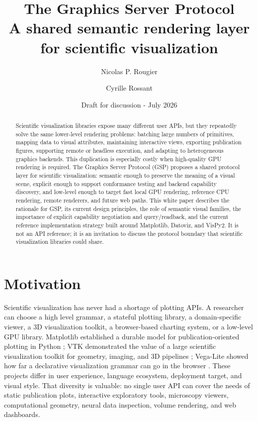 \documentclass[a4paper,11pt]{article}
\title{\textbf{The Graphics Server Protocol}\\
\large A shared semantic rendering layer for scientific visualization}
\author{Nicolas P. Rougier \and Cyrille Rossant}
\date{Draft for discussion - July 2026}
\newcommand{\gsp}{GSP\xspace}
\newcommand{\vispytwo}{VisPy2\xspace}
\newcommand{\datoviz}{Datoviz\xspace}
\newcommand{\matplotlib}{Matplotlib\xspace}
\begin{document}
\maketitle

\begin{abstract}
Scientific visualization libraries expose many different user APIs, but they repeatedly solve the
same lower-level rendering problems: batching large numbers of primitives, mapping data to visual
attributes, maintaining interactive views, exporting publication figures, supporting remote or
headless execution, and adapting to heterogeneous graphics backends. This duplication is especially
costly when high-quality GPU rendering is required. The Graphics Server Protocol (\gsp) proposes a
shared protocol layer for scientific visualization: semantic enough to preserve the meaning of a
visual scene, explicit enough to support conformance testing and backend capability discovery, and
low-level enough to target fast local GPU rendering, reference CPU rendering, remote renderers, and
future web paths. This white paper describes the rationale for \gsp, its current design principles,
the role of semantic visual families, the importance of explicit capability negotiation and
query/readback, and the current reference implementation strategy built around \matplotlib,
\datoviz, and \vispytwo. It is not an API reference; it is an invitation to discuss the protocol
boundary that scientific visualization libraries could share.
\end{abstract}

\tableofcontents

\section{Motivation}

Scientific visualization has never had a shortage of plotting APIs. A researcher can choose a high
level grammar, a stateful plotting library, a domain-specific viewer, a 3D visualization toolkit, a
browser-based charting system, or a low-level GPU library. \matplotlib established a durable model
for publication-oriented plotting in Python \cite{Hunter:2007}; VTK demonstrated the value of a
large scientific visualization toolkit for geometry, imaging, and 3D pipelines
\cite{Schroeder:2006}; Vega-Lite showed how far a declarative visualization grammar can go in the
browser \cite{Satyanarayan:2017}. These projects differ in user experience, language ecosystem,
deployment target, and visual style. That diversity is valuable: no single user API can cover the
needs of static publication plots, interactive exploratory tools, microscopy viewers,
computational geometry, neural data inspection, volume rendering, and web dashboards.
\end{document}
